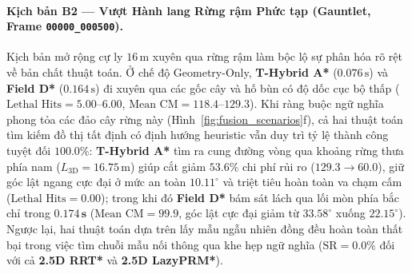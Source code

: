 \documentclass[a4paper,fleqn]{cas-sc}
\begin{document}
\paragraph{Kịch bản B2 — Vượt Hành lang Rừng rậm Phức tạp (Gauntlet, Frame \texttt{00000\_000500}).}
Kịch bản mở rộng cự ly $16\,\text{m}$ xuyên qua rừng rậm làm bộc lộ sự phân hóa rõ rệt về bản chất thuật toán. Ở chế độ Geometry-Only, \textbf{T-Hybrid A*} ($0.076\,\text{s}$) và \textbf{Field D*} ($0.164\,\text{s}$) đi xuyên qua các gốc cây và hố bùn có độ dốc cục bộ thấp ($\text{Lethal Hits} = 5.00\text{--}6.00$, $\text{Mean CM} = 118.4\text{--}129.3$). Khi ràng buộc ngữ nghĩa phong tỏa các đảo cây rừng này (Hình~\ref{fig:fusion_scenarios}f), cả hai thuật toán tìm kiếm đồ thị tất định có định hướng heuristic vẫn duy trì tỷ lệ thành công tuyệt đối $100.0\%$: \textbf{T-Hybrid A*} tìm ra cung đường vòng qua khoảng rừng thưa phía nam ($L_{\text{3D}} = 16.75\,\text{m}$) giúp cắt giảm \textbf{$53.6\%$} chi phí rủi ro ($129.3 \to \mathbf{60.0}$), giữ góc lật ngang cực đại ở mức an toàn $\mathbf{10.11^\circ}$ và triệt tiêu hoàn toàn va chạm cấm ($\text{Lethal Hits} = 0.00$); trong khi đó \textbf{Field D*} bám sát lách qua lối mòn phía bắc chỉ trong $\mathbf{0.174\,\text{s}}$ ($\text{Mean CM} = 99.9$, góc lật cực đại giảm từ $33.58^\circ$ xuống $22.15^\circ$). Ngược lại, hai thuật toán dựa trên lấy mẫu ngẫu nhiên đồng đều hoàn toàn thất bại trong việc tìm chuỗi mẫu nối thông qua khe hẹp ngữ nghĩa ($\text{SR} = \mathbf{0.0\%}$ đối với cả \textbf{2.5D RRT*} và \textbf{2.5D LazyPRM*}).
\end{document}
